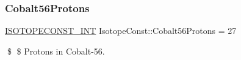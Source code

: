 \subsubsection{\texorpdfstring{Cobalt56\+Protons}{Cobalt56Protons}}
{\footnotesize\ttfamily \mbox{\hyperlink{group___isotope_const-_macros_ga5f18360b3e99483a35c32d789e62621c}{I\+S\+O\+T\+O\+P\+E\+C\+O\+N\+S\+T\+\_\+\+I\+NT}} Isotope\+Const\+::\+Cobalt56\+Protons = 27}

\$ \$ Protons in Cobalt-\/56. 